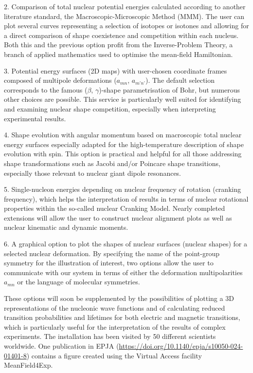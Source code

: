 2. Comparison of total nuclear potential energies calculated according to another literature standard, the Macroscopic-Microscopic Method (MMM). The user can plot several curves representing a selection of isotopes or isotones and allowing for a direct comparison of shape coexistence and competition within each nucleus. Both this and the previous option profit from the Inverse-Problem Theory, a branch of applied mathematics used to optimise the mean-field Hamiltonian.

3. Potential energy surfaces (2D maps) with user-chosen coordinate frames composed of multipole deformations ($a_{mn}$, $a_{m’n’}$). The default selection corresponds to the famous ($\beta$, $\gamma$)-shape parametrisation of Bohr, but numerous other choices are possible. This service is particularly well suited for identifying and examining nuclear shape competition, especially when interpreting experimental results.

4. Shape evolution with angular momentum based on macroscopic total nuclear energy surfaces especially adapted for the high-temperature description of shape evolution with spin. This option is practical and helpful for all those addressing shape transformations such as Jacobi and/or Poincare shape transitions, especially those relevant to nuclear giant dipole resonances.

5. Single-nucleon energies depending on nuclear frequency of rotation (cranking frequency), which helps the interpretation of results in terms of nuclear rotational properties within the so-called nuclear Cranking Model. Nearly completed extensions will allow the user to construct nuclear alignment plots as well as nuclear kinematic and dynamic moments. 

6. A graphical option to plot the shapes of nuclear surfaces (nuclear shapes) for a selected nuclear deformation.  By specifying the name of the point-group symmetry for the illustration of interest, two options allow the user to communicate with our system in terms of either the deformation multipolarities {$a_{mn}$} or the language of molecular symmetries.

These options will soon be supplemented by the possibilities of plotting a 3D representations of the nucleonic wave functions and of calculating reduced transition probabilities and lifetimes for both electric and magnetic transitions, which is particularly useful for the interpretation of the results of complex experiments. 
The installation has been visited by 50 different scientists worldwide. One publication in EPJA (\url{https://doi.org/10.1140/epja/s10050-024-01401-8}) contains a figure created using the Virtual Access facility MeanField4Exp.

